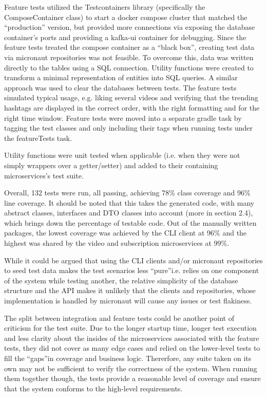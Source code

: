 \documentclass[parskip=full]{article}
\begin{document}
    Feature tests utilized the Testcontainers library (specifically the ComposeContainer \cite{composeTestContainer} class) to start a docker compose cluster that matched the ``production'' version, but provided more connections via exposing the database container's ports and providing a kafka-ui container for debugging.
    Since the feature tests treated the compose container as a ``black box'', creating test data via micronaut repositories was not feasible.
    To overcome this, data was written directly to the tables using a SQL connection.
    Utility functions were created to transform a minimal representation of entities into SQL queries.
    A similar approach was used to clear the databases between tests.
    The feature tests simulated typical usage, e.g. liking several videos and verifying that the trending hashtags are displayed in the correct order, with the right formatting and for the right time window.
    Feature tests were moved into a separate gradle task by tagging the test classes and only including their tags when running tests under the featureTests task.

    Utility functions were unit tested when applicable (i.e. when they were not simply wrappers over a getter/setter) and added to their containing microservices's test suite.

    Overall, 132 tests were run, all passing, achieving 78\% class coverage and 96\% line coverage.
    It should be noted that this takes the generated code, with many abstract classes, interfaces and DTO classes into account (more in section 2.4), which brings down the percentage of testable code.
    Out of the manually written packages, the lowest coverage was achieved by the CLI client at 96\% and the highest was shared by the video and subscription microservices at 99\%.

    While it could be argued that using the CLI clients and/or micronaut repositories to seed test data makes the test scenarios less ``pure''i.e. relies on one component of the system while testing another, the relative simplicity of the database structure and the API makes it unlikely that the clients and repositories, whose implementation is handled by micronaut will cause any issues or test flakiness.

    The split between integration and feature tests could be another point of criticism for the test suite.
    Due to the longer startup time, longer test execution and less clarity about the insides of the microservices associated with the feature tests, they did not cover as many edge cases and relied on the lower-level tests to fill the ``gaps''in coverage and business logic.
    Thererfore, any suite taken on its own may not be sufficient to verify the correctness of the system.
    When running them together though, the tests provide a reasonable level of coverage and ensure that the system conforms to the high-level requirements.
\end{document}

